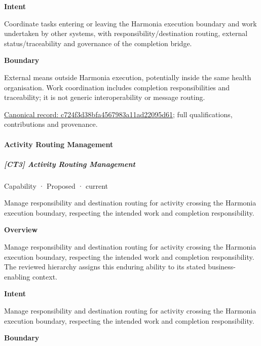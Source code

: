 \textbf{Intent}



Coordinate tasks entering or leaving the Harmonia execution boundary and work undertaken by other systems, with responsibility/destination routing, external status/traceability and governance of the completion bridge.



\textbf{Boundary}



External means outside Harmonia execution, potentially inside the same health organisation. Work coordination includes completion responsibilities and traceability; it is not generic interoperability or message routing.


{\footnotesize \href{../../../../continuum/strategy/capability/c724f3d38bfa4567983a11ad22095d61.md}{Canonical record: c724f3d38bfa4567983a11ad22095d61}; full qualifications, contributions and provenance.}\par
\paragraph{Activity Routing Management}

\subparagraph{[CT3] Activity Routing Management}

\label{element:27411c143e6e41ffba1af139fbbcd7e2}
{\small Capability · Proposed · current}\par

Manage responsibility and destination routing for activity crossing the Harmonia execution boundary, respecting the intended work and completion responsibility.



\textbf{Overview}



Manage responsibility and destination routing for activity crossing the Harmonia execution boundary, respecting the intended work and completion responsibility. The reviewed hierarchy assigns this enduring ability to its stated business-enabling context.



\textbf{Intent}



Manage responsibility and destination routing for activity crossing the Harmonia execution boundary, respecting the intended work and completion responsibility.



\textbf{Boundary}



